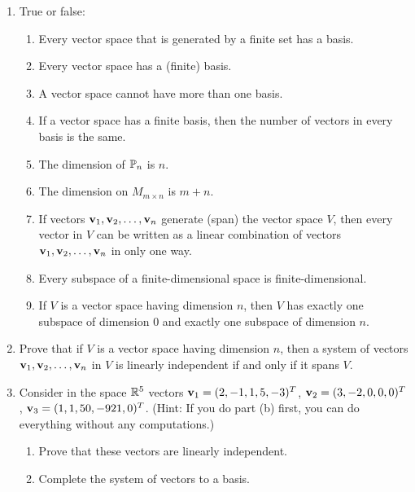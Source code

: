 \documentclass[../psets.tex]{subfiles}
\begin{document}
\begin{enumerate}[label={\textbf{5.\arabic*.}}]
    \item True or false:
    \begin{enumerate}
        \item Every vector space that is generated by a finite set has a basis.
        \item Every vector space has a (finite) basis.
        \item A vector space cannot have more than one basis.
        \item If a vector space has a finite basis, then the number of vectors in every basis is the same.
        \item The dimension of $\mathbb{P}_n$ is $n$.
        \item The dimension on $M_{m\times n}$ is $m+n$.
        \item If vectors $\mathbf{v}_1,\mathbf{v}_2,\dots,\mathbf{v}_n$ generate (span) the vector space $V$, then every vector in $V$ can be written as a linear combination of vectors $\mathbf{v}_1,\mathbf{v}_2,\dots,\mathbf{v}_n$ in only one way.
        \item Every subspace of a finite-dimensional space is finite-dimensional.
        \item If $V$ is a vector space having dimension $n$, then $V$ has exactly one subspace of dimension 0 and exactly one subspace of dimension $n$.
    \end{enumerate}
    \item Prove that if $V$ is a vector space having dimension $n$, then a system of vectors $\mathbf{v}_1,\mathbf{v}_2,\dots,\mathbf{v}_n$ in $V$ is linearly independent if and only if it spans $V$.
    \setcounter{enumi}{5}
    \item Consider in the space $\mathbb{R}^5$ vectors $\mathbf{v}_1=(2,-1,1,5,-3)^T$, $\mathbf{v}_2=(3,-2,0,0,0)^T$, $\mathbf{v}_3=(1,1,50,-921,0)^T$. (Hint: If you do part (b) first, you can do everything without any computations.)
    \begin{enumerate}
        \item Prove that these vectors are linearly independent.
        \item Complete the system of vectors to a basis.
    \end{enumerate}
\end{enumerate}
\end{document}
